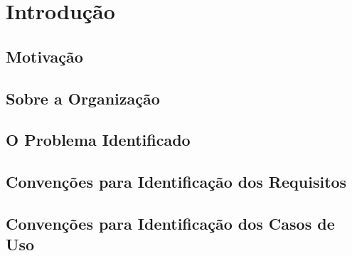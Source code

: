 \chapter*{Introdução}

\section{Motivação}


\section{Sobre a Organização}


\section{O Problema Identificado}


\section{Convenções para Identificação dos Requisitos}


\section{Convenções para Identificação dos Casos de Uso}
